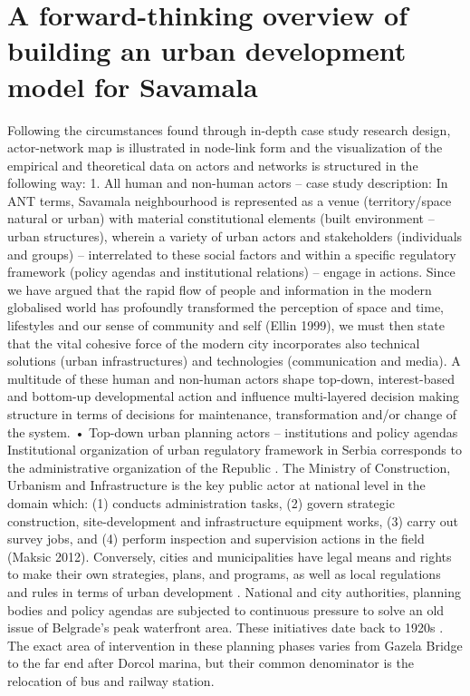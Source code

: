 \documentclass[11pt]{report}
\begin{document}
\section{A forward-thinking overview of building an urban development model for Savamala}

Following the circumstances found through in-depth case study research design, actor-network map is illustrated in node-link form and the visualization of the empirical and theoretical data on actors and networks is structured in the following way:
1.	All human and non-human actors – case study description: 
In ANT terms, Savamala neighbourhood is represented as a venue (territory/space natural or urban) with material constitutional elements (built environment – urban structures), wherein a variety of urban actors and stakeholders (individuals and groups) – interrelated to these social factors and within a specific regulatory framework (policy agendas and institutional relations) – engage in actions. Since we have argued that the rapid flow of people and information in the modern globalised world has profoundly transformed the perception of space and time, lifestyles and our sense of community and self (Ellin 1999), we must then state that the vital cohesive force of the modern city incorporates also technical solutions (urban infrastructures) and technologies (communication and media).
A multitude of  these human and non-human actors shape top-down, interest-based and bottom-up developmental action and influence multi-layered decision making structure in terms of decisions  for maintenance, transformation and/or change of the system. 
•	Top-down urban planning actors – institutions and policy agendas
Institutional organization of urban regulatory framework in Serbia corresponds to the administrative organization of the Republic . The Ministry of Construction, Urbanism and Infrastructure is the key public actor at national level in the domain which: (1) conducts administration tasks, (2) govern strategic construction, site-development and infrastructure equipment works, (3) carry out survey jobs, and (4) perform inspection and supervision actions in the field (Maksic 2012). Conversely, cities and municipalities have legal means and rights to make their own strategies, plans, and programs, as well as local regulations and rules in terms of urban development . 
National and city authorities, planning bodies and policy agendas are subjected to continuous pressure to solve an old issue of Belgrade’s peak waterfront area. These initiatives date back to 1920s . The exact area of intervention in these planning phases varies from Gazela Bridge to the far end after Dorcol marina, but their common denominator is the relocation of bus and railway station.
\end{document}
